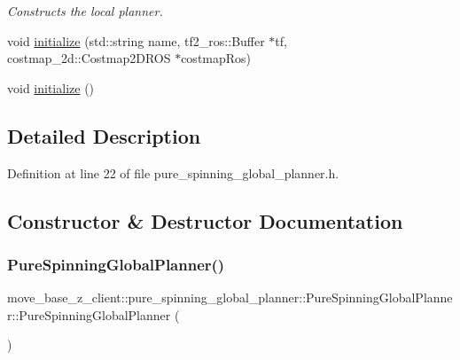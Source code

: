 \begin{DoxyCompactItemize}
\begin{DoxyCompactList}\small\item\em Constructs the local planner. \end{DoxyCompactList}\item 
void \hyperlink{classmove__base__z__client_1_1pure__spinning__global__planner_1_1PureSpinningGlobalPlanner_a8050cca93460b00a3ec391a98a25849a}{initialize} (std\+::string name, tf2\+\_\+ros\+::\+Buffer $\ast$tf, costmap\+\_\+2d\+::\+Costmap2\+D\+R\+OS $\ast$costmap\+Ros)
\item 
void \hyperlink{classmove__base__z__client_1_1pure__spinning__global__planner_1_1PureSpinningGlobalPlanner_aadd62d3fb2f062f821593f63b5a9bfaa}{initialize} ()
\end{DoxyCompactItemize}


\subsection{Detailed Description}


Definition at line 22 of file pure\+\_\+spinning\+\_\+global\+\_\+planner.\+h.



\subsection{Constructor \& Destructor Documentation}
\mbox{\label{classmove__base__z__client_1_1pure__spinning__global__planner_1_1PureSpinningGlobalPlanner_a8c75c60417dc9dacfabbc35a7f130bee}} 
\subsubsection{\texorpdfstring{Pure\+Spinning\+Global\+Planner()}{PureSpinningGlobalPlanner()}}
{\footnotesize\ttfamily move\+\_\+base\+\_\+z\+\_\+client\+::pure\+\_\+spinning\+\_\+global\+\_\+planner\+::\+Pure\+Spinning\+Global\+Planner\+::\+Pure\+Spinning\+Global\+Planner (\begin{DoxyParamCaption}{ }\end{DoxyParamCaption})}

